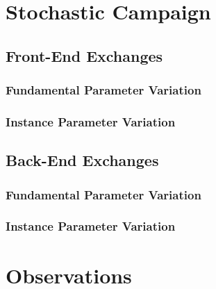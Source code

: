 \section{Stochastic Campaign}\label{results:stochastic}

\subsection{Front-End Exchanges}

\subsubsection{Fundamental Parameter Variation}

\subsubsection{Instance Parameter Variation}

\subsection{Back-End Exchanges}

\subsubsection{Fundamental Parameter Variation}

\subsubsection{Instance Parameter Variation}

\section{Observations}
